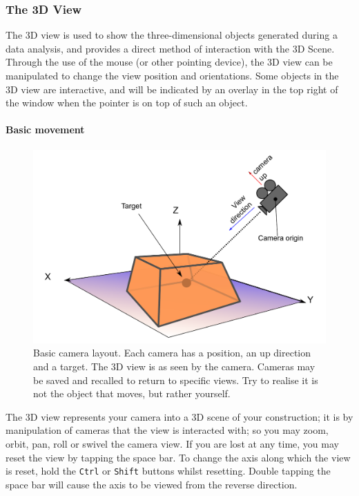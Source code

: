 \documentclass[10pt]{article}
\begin{document}
\subsubsection{The 3D View}

The 3D view is used to show the three-dimensional objects generated during a data analysis, and provides a direct method of interaction with the 3D Scene. Through the use of the mouse (or other pointing device), the 3D view can be manipulated to change the view position and orientations. Some objects in the 3D view are interactive, and will be indicated by an overlay in the top right of the window when the pointer is on top of such an object. 



\paragraph{Basic movement}
\begin{figure}[ht]
\centering
 \includegraphics[width=0.7 \textwidth,keepaspectratio=true]{./figures/camera.pdf}

 \caption{Basic camera layout. Each camera has a position, an up direction and a target. The 3D view is as seen by the camera. Cameras may be saved and recalled to return to specific views. Try to realise it is not the object that moves, but rather yourself.}
\label{fig:camera-basics}
\end{figure}
The 3D view represents your camera into a 3D scene of your construction; it is by manipulation of cameras that the view is interacted with; so you may zoom, orbit, pan, roll or swivel the camera view. If you are lost at any time, you may reset the view by tapping the space bar. To change the axis along which the view is reset, hold the \texttt{Ctrl} or \texttt{Shift} buttons whilst resetting.  Double tapping the space bar will cause the axis to be viewed from the reverse direction.
\end{document}
